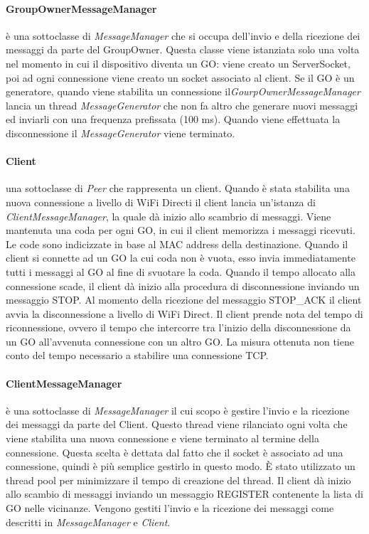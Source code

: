 \documentclass{llncs}
\begin{document}
\paragraph{GroupOwnerMessageManager} è una sottoclasse di \emph{MessageManager} che si occupa dell'invio e della ricezione dei messaggi da parte del GroupOwner. Questa classe viene istanziata solo una volta nel momento in cui 
il dispositivo diventa un GO: viene creato un ServerSocket, poi ad ogni connessione viene creato un socket associato al client. Se il GO è un generatore, quando viene stabilita un connessione il\emph{GourpOwnerMessageManager} lancia 
un thread \emph{MessageGenerator} che non fa altro che generare nuovi messaggi ed inviarli con una frequenza prefissata (100 ms). Quando viene effettuata la disconnessione il \emph{MessageGenerator} viene terminato.

\paragraph{Client} una sottoclasse di \emph{Peer} che rappresenta un client. Quando è stata stabilita una nuova connessione a livello di WiFi Directi il client lancia un'istanza di \emph{ClientMessageManager}, la quale dà inizio allo 
scambrio di messaggi. Viene mantenuta una coda per ogni GO, 
in cui il client memorizza i messaggi ricevuti. Le code sono indicizzate in base al MAC address della destinazione. Quando il client si connette ad un GO la cui coda non è vuota, esso invia immediatamente tutti i messaggi al GO al 
fine di svuotare la coda. Quando il tempo allocato alla connessione scade, il client dà inizio alla procedura di disconnessione inviando un messaggio STOP. Al momento della ricezione del messaggio STOP\_ACK il client avvia 
la disconnessione a livello di WiFi Direct. Il client prende nota del tempo di riconnessione, ovvero il tempo che intercorre tra l'inizio della disconnessione da un GO all'avvenuta connessione con un altro GO. La misura ottenuta non 
tiene conto del tempo necessario a stabilire una connessione TCP.

\paragraph{ClientMessageManager} è una sottoclasse di \emph{MessageManager} il cui scopo è gestire l'invio e la ricezione dei messaggi da parte del Client. Questo thread viene rilanciato ogni volta che viene stabilita una nuova 
connessione e viene terminato al termine della connessione. Questa scelta è dettata dal fatto che il socket è associato ad una connessione, quindi è più semplice gestirlo in questo modo. È stato utilizzato un thread pool per minimizzare 
il tempo di creazione del thread. Il client dà inizio allo scambio di messaggi inviando un messaggio REGISTER contenente la lista di GO nelle vicinanze. Vengono gestiti l'invio e la ricezione dei messaggi come descritti in 
\emph{MessageManager} e \emph{Client}.
\end{document}
